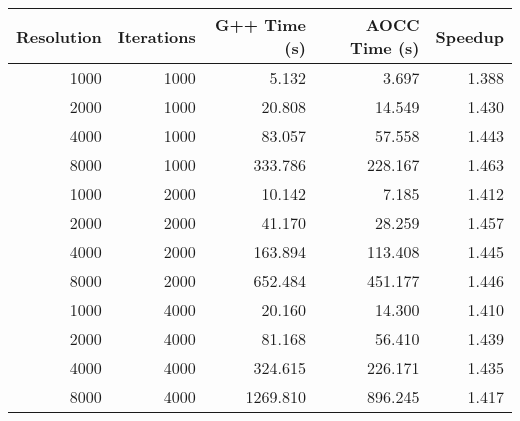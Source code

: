 \begin{tabular}{rrrrr}
\toprule
Resolution & Iterations & G++ Time (s) & AOCC Time (s) & Speedup \\
\midrule
1000 & 1000 & 5.132 & 3.697 & 1.388 \\
2000 & 1000 & 20.808 & 14.549 & 1.430 \\
4000 & 1000 & 83.057 & 57.558 & 1.443 \\
8000 & 1000 & 333.786 & 228.167 & 1.463 \\
1000 & 2000 & 10.142 & 7.185 & 1.412 \\
2000 & 2000 & 41.170 & 28.259 & 1.457 \\
4000 & 2000 & 163.894 & 113.408 & 1.445 \\
8000 & 2000 & 652.484 & 451.177 & 1.446 \\
1000 & 4000 & 20.160 & 14.300 & 1.410 \\
2000 & 4000 & 81.168 & 56.410 & 1.439 \\
4000 & 4000 & 324.615 & 226.171 & 1.435 \\
8000 & 4000 & 1269.810 & 896.245 & 1.417 \\
\bottomrule
\end{tabular}
